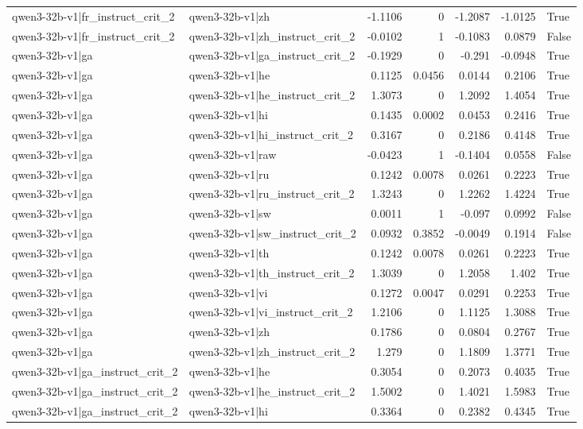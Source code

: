 \begin{table}
\begin{tabular}{l l r r r r l}
qwen3-32b-v1|fr_instruct_crit_2 & qwen3-32b-v1|zh & -1.1106 & 0 & -1.2087 & -1.0125 & True \\
qwen3-32b-v1|fr_instruct_crit_2 & qwen3-32b-v1|zh_instruct_crit_2 & -0.0102 & 1 & -0.1083 & 0.0879 & False \\
qwen3-32b-v1|ga & qwen3-32b-v1|ga_instruct_crit_2 & -0.1929 & 0 & -0.291 & -0.0948 & True \\
qwen3-32b-v1|ga & qwen3-32b-v1|he & 0.1125 & 0.0456 & 0.0144 & 0.2106 & True \\
qwen3-32b-v1|ga & qwen3-32b-v1|he_instruct_crit_2 & 1.3073 & 0 & 1.2092 & 1.4054 & True \\
qwen3-32b-v1|ga & qwen3-32b-v1|hi & 0.1435 & 0.0002 & 0.0453 & 0.2416 & True \\
qwen3-32b-v1|ga & qwen3-32b-v1|hi_instruct_crit_2 & 0.3167 & 0 & 0.2186 & 0.4148 & True \\
qwen3-32b-v1|ga & qwen3-32b-v1|raw & -0.0423 & 1 & -0.1404 & 0.0558 & False \\
qwen3-32b-v1|ga & qwen3-32b-v1|ru & 0.1242 & 0.0078 & 0.0261 & 0.2223 & True \\
qwen3-32b-v1|ga & qwen3-32b-v1|ru_instruct_crit_2 & 1.3243 & 0 & 1.2262 & 1.4224 & True \\
qwen3-32b-v1|ga & qwen3-32b-v1|sw & 0.0011 & 1 & -0.097 & 0.0992 & False \\
qwen3-32b-v1|ga & qwen3-32b-v1|sw_instruct_crit_2 & 0.0932 & 0.3852 & -0.0049 & 0.1914 & False \\
qwen3-32b-v1|ga & qwen3-32b-v1|th & 0.1242 & 0.0078 & 0.0261 & 0.2223 & True \\
qwen3-32b-v1|ga & qwen3-32b-v1|th_instruct_crit_2 & 1.3039 & 0 & 1.2058 & 1.402 & True \\
qwen3-32b-v1|ga & qwen3-32b-v1|vi & 0.1272 & 0.0047 & 0.0291 & 0.2253 & True \\
qwen3-32b-v1|ga & qwen3-32b-v1|vi_instruct_crit_2 & 1.2106 & 0 & 1.1125 & 1.3088 & True \\
qwen3-32b-v1|ga & qwen3-32b-v1|zh & 0.1786 & 0 & 0.0804 & 0.2767 & True \\
qwen3-32b-v1|ga & qwen3-32b-v1|zh_instruct_crit_2 & 1.279 & 0 & 1.1809 & 1.3771 & True \\
qwen3-32b-v1|ga_instruct_crit_2 & qwen3-32b-v1|he & 0.3054 & 0 & 0.2073 & 0.4035 & True \\
qwen3-32b-v1|ga_instruct_crit_2 & qwen3-32b-v1|he_instruct_crit_2 & 1.5002 & 0 & 1.4021 & 1.5983 & True \\
qwen3-32b-v1|ga_instruct_crit_2 & qwen3-32b-v1|hi & 0.3364 & 0 & 0.2382 & 0.4345 & True \\

\end{tabular}
\end{table}
